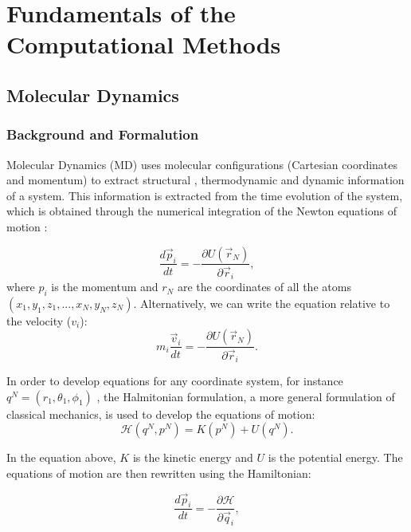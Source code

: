 
\chapter{Fundamentals of the Computational Methods} %

\label{Chapter3} %

\section{Molecular Dynamics}

\subsection{Background and Formalution}
Molecular Dynamics (MD) uses molecular configurations (Cartesian coordinates and momentum) to extract structural , thermodynamic and dynamic information of a system. This information is extracted from the time evolution of the system, which is obtained  through the numerical integration of the Newton equations of motion \cite{tuckerman}:

\begin{equation}
\frac{d \vec{p}_{i}}{dt} = - \frac{\partial U (\vec{r}_{N})}{\partial \vec{r}_{i}},
\end{equation}
where $p_{i}$ is the momentum and $r_{N}$ are the coordinates of all the atoms$(x_{1},y_{1},z_{1},...,x_{N},y_{N},z_{N})$. Alternatively, we can write the equation relative to the velocity ($v_{i}$):
\begin{equation}
m_{i} \frac{\vec{v}_{i}}{dt} = - \frac{\partial U (\vec{r}_{N})}{\partial \vec{r}_{i}}.
\end{equation}

In order to develop equations for any coordinate system, for instance $q^{N}=(r_{1},\theta _{1},\phi _{1})$ , the Halmitonian formulation, a more general formulation of classical mechanics,  is used to develop the equations of motion:
\begin{equation}
\mathcal{H} (q^{N},p^{N}) = K(p^{N}) + U(q^{N}) .
\end{equation}

In the equation above, $K$ is the kinetic energy and $U$ is the potential energy. The equations of motion are then rewritten using the Hamiltonian:

\begin{equation}
\frac{d \vec{p}_{i}}{dt} = - \frac{\partial \mathcal{H}}{\partial \vec{q}_{i}},
\end{equation}

